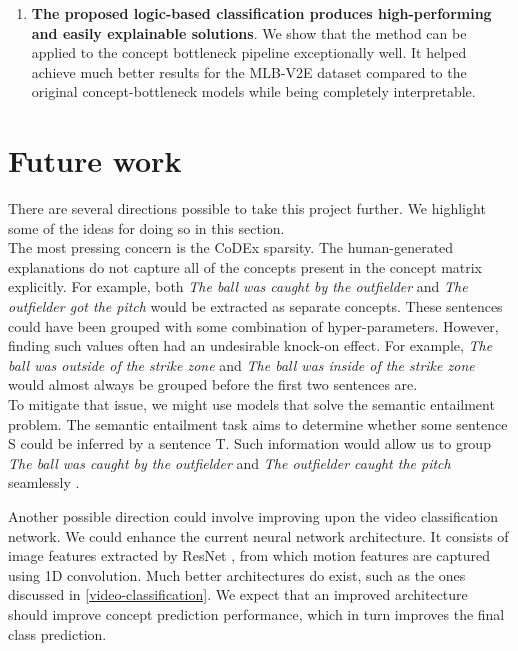\begin{enumerate}
    \item \textbf{The proposed logic-based classification produces high-performing and easily explainable solutions}.
    We show that the method can be applied to the concept bottleneck pipeline exceptionally well.
    It helped achieve much better results for the MLB-V2E dataset \cite{RefWorks:RefID:16-2021automatic} compared to the original concept-bottleneck models while being completely interpretable.
\end{enumerate}

\section{Future work}

There are several directions possible to take this project further. We highlight some of the ideas for doing so in this section. \\

The most pressing concern is the CoDEx sparsity.
The human-generated explanations do not capture all of the concepts present in the concept matrix explicitly.
For example, both \emph{The ball was caught by the outfielder} and \emph{The outfielder got the pitch} would be extracted as separate concepts.
These sentences could have been grouped with some combination of hyper-parameters. 
However, finding such values often had an undesirable knock-on effect.
For example, \emph{The ball was outside of the strike zone} and \emph{The ball was inside of the strike zone} would almost always be grouped before the first two sentences are. \\
To mitigate that issue, we might use models that solve the semantic entailment problem.
The semantic entailment task aims to determine whether some sentence S could be inferred by a sentence T.
Such information would allow us to group \emph{The ball was caught by the outfielder} and \emph{The outfielder caught the pitch} seamlessly \cite{RefWorks:RefID:85-salvo2005inference}.


Another possible direction could involve improving upon the video classification network.
We could enhance the current neural network architecture.
It consists of image features extracted by ResNet \cite{RefWorks:RefID:86-he2016deep}, from which motion features are captured using 1D convolution.
Much better architectures do exist, such as the ones discussed in \ref{video-classification}.
We expect that an improved architecture should improve concept prediction performance, which in turn improves the final class prediction.

